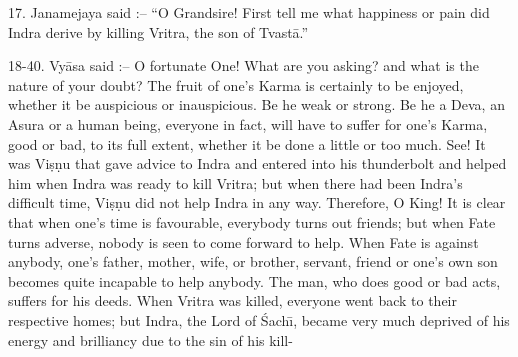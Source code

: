 17. Janamejaya said :-- ``O Grandsire! First tell me what happiness or pain did Indra derive by killing Vritra, the son of Tvast\=a.''

18-40. Vy\=asa said :-- O fortunate One! What are you asking? and what is the nature of your doubt? The fruit of one's Karma is certainly to be enjoyed, whether it be auspicious or inauspicious. Be he weak or strong. Be he a Deva, an Asura or a human being, everyone in fact, will have to suffer for one's Karma, good or bad, to its full extent, whether it be done a little or too much. See! It was Vi\d{s}\d{n}u that gave advice to Indra and entered into his thunderbolt and helped him when Indra was ready to kill Vritra; but when there had been Indra's difficult time, Vi\d{s}\d{n}u did not help Indra in any way. Therefore, O King! It is clear that when one's time is favourable, everybody turns out friends; but when Fate turns adverse, nobody is seen to come forward to help. When Fate is against anybody, one's father, mother, wife, or brother, servant, friend or one's own son becomes quite incapable to help anybody. The man, who does good or bad acts, suffers for his deeds. When Vritra was killed, everyone went back to their respective homes; but Indra, the Lord of \'Sach\={\i}, became very much deprived of his energy and brilliancy due to the sin of his kill-

